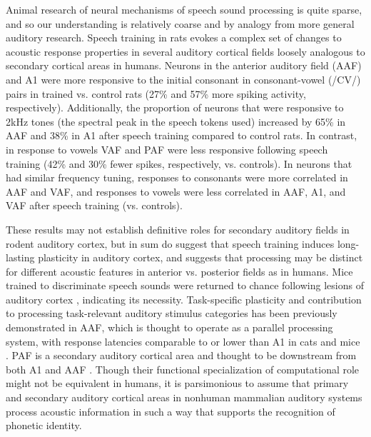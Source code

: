 Animal research of neural mechanisms of speech sound processing is quite sparse, and so our understanding is relatively coarse and by analogy from more general auditory research. Speech training in rats evokes a complex set of changes to acoustic response properties in several auditory cortical fields loosely analogous to secondary cortical areas in humans\citep{engineerSpeechTrainingAlters2015a}. Neurons in the anterior auditory field (AAF) and A1 were more responsive to the initial consonant in consonant-vowel (/CV/) pairs in trained vs. control rats (27\% and 57\% more spiking activity, respectively). Additionally, the proportion of neurons that were responsive to 2kHz tones (the spectral peak in the speech tokens used) increased by 65\% in AAF and 38\% in A1 after speech training compared to control rats. In contrast, in response to vowels VAF and PAF were less responsive following speech training (42\% and 30\% fewer spikes, respectively, vs. controls). In neurons that had similar frequency tuning, responses to consonants were more correlated in AAF and VAF, and responses to vowels were less correlated in AAF, A1, and VAF after speech training (vs. controls)\citep{engineerSpeechTrainingAlters2015a}. 

These results \citep{engineerSpeechTrainingAlters2015a} may not establish definitive roles for secondary auditory fields in rodent auditory cortex, but in sum do suggest that speech training induces long-lasting plasticity in auditory cortex, and suggests that processing may be distinct for different acoustic features in anterior vs. posterior fields as in humans. Mice trained to discriminate speech sounds were returned to chance following lesions of auditory cortex \citep{saundersMiceCanLearn2019}, indicating its necessity. Task-specific plasticity \citep{takahashiLearningstagedependentFieldspecificMap2011} and contribution to processing task-relevant auditory stimulus categories \citep{shiAnteriorAuditoryField2019} has been previously demonstrated in AAF, which is thought to operate as a parallel processing system, with response latencies comparable to or lower than A1 in cats \citep{carrascoNeuronalActivationTimes2011} and mice \citep{lindenSpectrotemporalStructureReceptive2003b}. PAF is a secondary auditory cortical area and thought to be downstream from both A1 and AAF \citep{pandyaSpectralTemporalProcessing2008,carrascoEvidenceHierarchicalProcessing2009}. Though their functional specialization of computational role might not be equivalent in humans, it is parsimonious to assume that primary and secondary auditory cortical areas in nonhuman mammalian auditory systems process acoustic information in such a way that supports the recognition of phonetic identity. 

